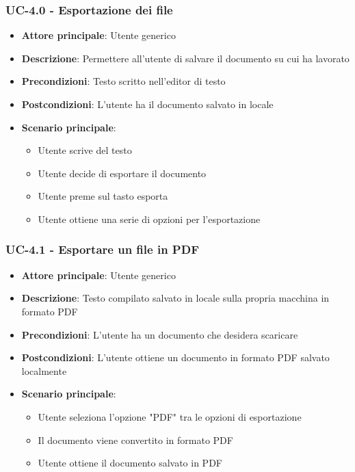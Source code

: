 \documentclass[11pt,a4paper]{article}
\begin{document}
\subsubsection{UC-4.0 - Esportazione dei file}
\begin{itemize}
    \item \textbf{Attore principale}: Utente generico
    \item \textbf{Descrizione}: Permettere all'utente di salvare il documento su cui ha lavorato
    \item \textbf{Precondizioni}: Testo scritto nell'editor di testo
    \item \textbf{Postcondizioni}: L'utente ha il documento salvato in locale
    \item \textbf{Scenario principale}:
        \begin{itemize}
            \item Utente scrive del testo
            \item Utente decide di esportare il documento
            \item Utente preme sul tasto esporta
            \item Utente ottiene una serie di opzioni per l'esportazione
        \end{itemize}
\end{itemize}

\subsubsection{UC-4.1 - Esportare un file in PDF}
\begin{itemize}
    \item \textbf{Attore principale}: Utente generico
    \item \textbf{Descrizione}: Testo compilato salvato in locale sulla propria macchina in formato PDF
    \item \textbf{Precondizioni}: L'utente ha un documento che desidera scaricare
    \item \textbf{Postcondizioni}: L'utente ottiene un documento in formato PDF salvato localmente
    \item \textbf{Scenario principale}:
        \begin{itemize}
            \item Utente seleziona l'opzione "PDF" tra le opzioni di esportazione
            \item Il documento viene convertito in formato PDF
            \item Utente ottiene il documento salvato in PDF
        \end{itemize}
\end{itemize}
\end{document}
